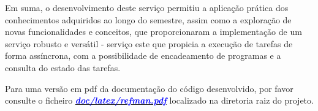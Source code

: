 \documentclass[a4paper,11pt]{scrreprt}
\begin{document}
    Em suma, o desenvolvimento deste serviço permitiu a aplicação prática
    dos conhecimentos adquiridos ao longo do semestre, assim como a
    exploração de novas funcionalidades e conceitos, que proporcionaram
    a implementação de um serviço robusto e versátil - serviço este que
    propicia a execução de tarefas de forma assíncrona, com a possibilidade de
    encadeamento de programas e a consulta do estado das tarefas.


%


    \quad Para uma versão em pdf da documentação do código desenvolvido, por favor consulte o
    ficheiro \href{anexos/refman.pdf}{\textcolor{blue}{\textbf{\textit{doc/latex/refman.pdf}}}}
    localizado na diretoria raiz do projeto.


\end{document}
